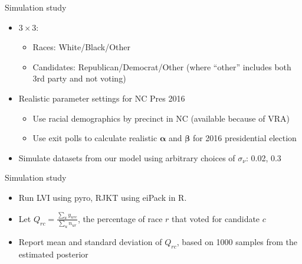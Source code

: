 \documentclass[
  ignorenonframetext,
]{beamer}
\providecommand{\tightlist}{%
  \setlength{\itemsep}{0pt}\setlength{\parskip}{0pt}}
\begin{document}
\begin{frame}{Simulation study}
\protect\hypertarget{simulation-study}{}

\begin{itemize}
\tightlist
\item
  \(3\times 3\):

  \begin{itemize}
  \tightlist
  \item
    Races: White/Black/Other
  \item
    Candidates: Republican/Democrat/Other (where ``other'' includes both
    3rd party and not voting)
  \end{itemize}
\item
  Realistic parameter settings for NC Pres 2016

  \begin{itemize}
  \tightlist
  \item
    Use racial demographics by precinct in NC (available because of VRA)
  \item
    Use exit polls to calculate realistic \(\bm{\alpha}\) and
    \(\bm{\beta}\) for 2016 presidential election
  \end{itemize}
\item
  Simulate datasets from our model using arbitrary choices of
  \(\sigma_\nu\): 0.02, 0.3
\end{itemize}

\end{frame}

\begin{frame}{Simulation study}
\protect\hypertarget{simulation-study-1}{}

\begin{itemize}
\tightlist
\item
  Run LVI using pyro, RJKT using eiPack in R.
\item
  Let \(Q_{rc}=\frac{\sum_u y_{urc}}{\sum_u n_{ur}}\), the percentage of
  race \(r\) that voted for candidate \(c\)
\item
  Report mean and standard deviation of \(Q_{rc}\), based on 1000
  samples from the estimated posterior
\end{itemize}

\end{frame}
\end{document}
